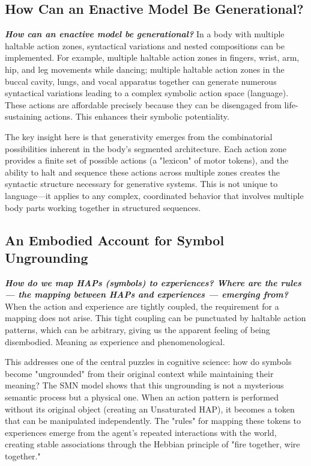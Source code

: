\subsection{How Can an Enactive Model Be Generational?}
\textbf{\textit{How can an enactive model be generational?}} In a body with multiple haltable action zones, syntactical variations and nested compositions can be implemented. For example, multiple haltable action zones in fingers, wrist, arm, hip, and leg movements while dancing; multiple haltable action zones in the buccal cavity, lungs, and vocal apparatus together can generate numerous syntactical variations leading to a complex symbolic action space (language). These actions are affordable precisely because they can be disengaged from life-sustaining actions. This enhances their symbolic potentiality.

The key insight here is that generativity emerges from the combinatorial possibilities inherent in the body's segmented architecture. Each action zone provides a finite set of possible actions (a "lexicon" of motor tokens), and the ability to halt and sequence these actions across multiple zones creates the syntactic structure necessary for generative systems. This is not unique to language—it applies to any complex, coordinated behavior that involves multiple body parts working together in structured sequences.

\subsection{An Embodied Account for Symbol Ungrounding}
\textbf{\textit{How do we map HAPs (symbols) to experiences? Where are the rules — the mapping between HAPs and experiences — emerging from?}} When the action and experience are tightly coupled, the requirement for a mapping does not arise. This tight coupling can be punctuated by haltable action patterns, which can be arbitrary, giving us the apparent feeling of being disembodied. Meaning as experience and phenomenological.

This addresses one of the central puzzles in cognitive science: how do symbols become "ungrounded" from their original context while maintaining their meaning? The SMN model shows that this ungrounding is not a mysterious semantic process but a physical one. When an action pattern is performed without its original object (creating an Unsaturated HAP), it becomes a token that can be manipulated independently. The "rules" for mapping these tokens to experiences emerge from the agent's repeated interactions with the world, creating stable associations through the Hebbian principle of "fire together, wire together."

